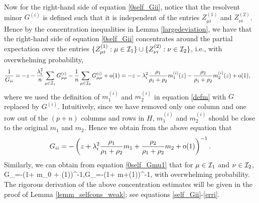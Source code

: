 \medskip
{} Now for the right-hand side of equation \eqref{0self_Gii}, notice that the resolvent minor $G^{(i)}$ is defined such that it is independent of the entries $Z^{(1)}_{\mu i}$ and $Z^{(2)}_{\nu i}$. Hence by the concentration inequalities in Lemma \ref{largedeviation}, we have that the  right-hand side of equation \eqref{0self_Gii} concentrates around the partial expectation over the entries $\{Z^{(1)}_{\mu i}: \mu \in \cal I_1 \}\cup \{Z^{(2)}_{\nu i}: \nu \in \cal I_2\}$, i.e., with overwhelming probability,
\begin{align*}
\frac{1}{{G_{ii} }}&=  - z - \frac{\lambda_i^2}{n} \sum_{\mu \in \mathcal I_1}  G^{\left( i \right)}_{\mu\mu} - \frac{1}{n} \sum_{\mu\in \mathcal I_2} G^{\left( i \right)}_{\mu\mu} +\oo(1)= - z - \lambda_i^2 \frac{\rho_1}{\rho_1+\rho_2} m_1^{(i)}(z)-  \frac{\rho_2}{\rho_1+\rho_2} m_2^{(i)}(z)+\oo(1),
\end{align*}
where we used the definition of $m_1^{(i)}$ and $m_2^{(i)}$ in equation \eqref{defm} with $G$ replaced by $G^{(i)}$. Intuitively, since we have removed only one column and one row out of the $(p+n)$ columns and rows in $H$, $m_1^{(i)}$ and $m_2^{(i)}$ should be close to the original $m_1$ and $m_2$. Hence we obtain from the above equation that
\begin{align}\label{1self_Gii}
 G_{ii}  = -\left( z +\lambda_i^2 \frac{\rho_1}{\rho_1+\rho_2} m_1 +  \frac{\rho_2}{\rho_1+\rho_2}m_2+\oo(1)\right)^{-1}.
\end{align}
Similarly, we can obtain from equation \eqref{0self_Gmu1} that for $\mu \in \cal I_1$ and $\nu\in \cal I_2$,
\be\label{1self_Gmu} G_{\mu \mu }=-\left(1+ m_0 + \oo(1)\right)^{-1},\quad G_{\nu\nu}=-\left(1+ m+\oo(1)\right)^{-1},\ee
with overwhelming probability. The rigorous derivation of the above concentration estimates will be given in the proof of Lemma \ref{lemm_selfcons_weak}; see equations \eqref{self_Gii}-\eqref{erri}.

